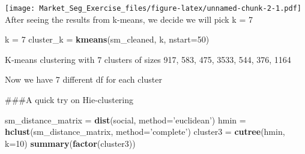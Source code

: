 \documentclass[]{article}
\newenvironment{Shaded}{\begin{snugshade}}{\end{snugshade}}
\newcommand{\ControlFlowTok}[1]{\textcolor[rgb]{0.13,0.29,0.53}{\textbf{#1}}}
\newcommand{\DataTypeTok}[1]{\textcolor[rgb]{0.13,0.29,0.53}{#1}}
\newcommand{\DecValTok}[1]{\textcolor[rgb]{0.00,0.00,0.81}{#1}}
\newcommand{\KeywordTok}[1]{\textcolor[rgb]{0.13,0.29,0.53}{\textbf{#1}}}
\newcommand{\NormalTok}[1]{#1}
\newcommand{\OperatorTok}[1]{\textcolor[rgb]{0.81,0.36,0.00}{\textbf{#1}}}
\newcommand{\StringTok}[1]{\textcolor[rgb]{0.31,0.60,0.02}{#1}}
\begin{document}
\texttt{[image: Market\_Seg\_Exercise\_files/figure-latex/unnamed-chunk-2-1.pdf]}
After seeing the results from k-means, we decide we will pick k = 7

\begin{Shaded}
\begin{Highlighting}[]
\NormalTok{k =}\StringTok{ }\DecValTok{7}
\NormalTok{cluster_k =}\StringTok{ }\KeywordTok{kmeans}\NormalTok{(sm_cleaned, k, }\DataTypeTok{nstart=}\DecValTok{50}\NormalTok{)}
\end{Highlighting}
\end{Shaded}

K-means clustering with 7 clusters of sizes 917, 583, 475, 3533, 544,
376, 1164

\begin{Shaded}
\end{Shaded}

Now we have 7 different df for each cluster

\#\#\#A quick try on Hie-clustering

\begin{Shaded}
\begin{Highlighting}[]
\NormalTok{sm_distance_matrix =}\StringTok{ }\KeywordTok{dist}\NormalTok{(social, }\DataTypeTok{method=}\StringTok{'euclidean'}\NormalTok{)}
\NormalTok{hmin =}\StringTok{ }\KeywordTok{hclust}\NormalTok{(sm_distance_matrix, }\DataTypeTok{method=}\StringTok{'complete'}\NormalTok{)}
\NormalTok{cluster3 =}\StringTok{ }\KeywordTok{cutree}\NormalTok{(hmin, }\DataTypeTok{k=}\DecValTok{10}\NormalTok{)}
\KeywordTok{summary}\NormalTok{(}\KeywordTok{factor}\NormalTok{(cluster3))}
\end{Highlighting}
\end{Shaded}
\end{document}
